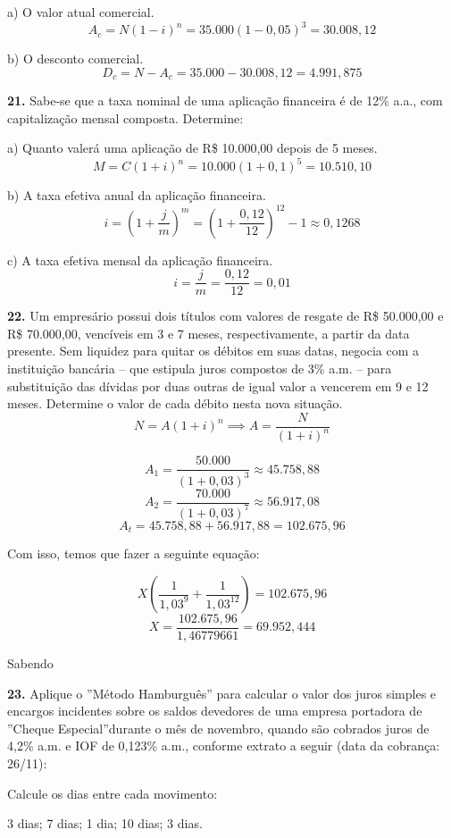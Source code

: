 \documentclass[12pt,a4paper]{article}
\begin{document}
  a) O valor atual comercial.
  \[
    A_c = N(1-i)^n = 35.000(1-0,05)^3 = 30.008,12
  \]

  b) O desconto comercial.
  \[
    D_c = N - A_c = 35.000 - 30.008,12 = 4.991,875
  \]

  \textbf{21.} Sabe-se que a taxa nominal de uma aplicação financeira é de 12\% a.a., com
capitalização mensal composta. Determine:

  a) Quanto valerá uma aplicação de R\$ 10.000,00 depois de 5 meses.
  \[
    M = C ( 1 + i)^n = 10.000 ( 1 + 0,1 )^5 = 10.510,10
  \]


  b) A taxa efetiva anual da aplicação financeira.
  \[
    i = \left( 1 + \frac{j}{m} \right)^m = \left( 1 + \frac{0,12}{12} \right)^12 - 1 \approx 0,1268  
  \]

  c) A taxa efetiva mensal da aplicação financeira.
  \[
    i = \frac{j}{m} = \frac{0,12}{12} = 0,01
  \]

  \textbf{22.} Um empresário possui dois títulos com valores de resgate de R\$ 50.000,00 e R\$
70.000,00, vencíveis em 3 e 7 meses, respectivamente, a partir da data presente. Sem
liquidez para quitar os débitos em suas datas, negocia com a instituição bancária – que
estipula juros compostos de 3\% a.m. – para substituição das dívidas por duas outras de
igual valor a vencerem em 9 e 12 meses. Determine o valor de cada débito nesta nova
situação.
\[
  N = A ( 1 + i )^n \implies A = \frac{N}{(1+i)^n}
\]

\[
  A_1 = \frac{50.000}{(1+0,03)^3} \approx 45.758,88
\]
\[
  A_2 = \frac{70.000}{(1+0,03)^7} \approx 56.917,08
\]
\[
  A_t = 45.758,88 + 56.917,88 = 102.675,96
\]

Com isso, temos que fazer a seguinte equação:

\[
  X \left( \frac{1}{1,03^9} + \frac{1}{1,03^{12}} \right) = 102.675,96
\]
\[
  X = \frac{102.675,96}{1,46779661} = 69.952,444
\]

Sabendo

\textbf{23.} Aplique o ”Método Hamburguês” para calcular o valor dos juros simples
e encargos incidentes sobre os saldos devedores de uma empresa portadora de 
”Cheque Especial”durante o mês de novembro, quando são cobrados juros de 4,2\% a.m. e IOF de
0,123\% a.m., conforme extrato a seguir (data da cobrança: 26/11):
\vspace*{.5cm}

Calcule os dias entre cada movimento:
 
\begin{center}
  3 dias; 7 dias; 1 dia; 10 dias; 3 dias.
\end{center}
\end{document}
